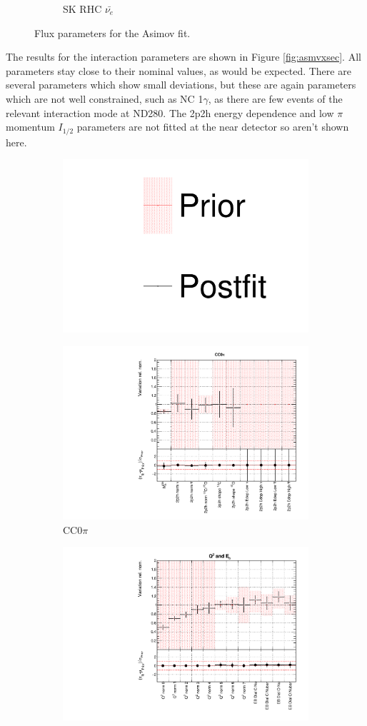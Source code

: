 \begin{figure}
\begin{subfigure}{0.24\textwidth}
  \caption{SK RHC $\bar{\nu_e}$}
\end{subfigure}
\caption{Flux parameters for the Asimov fit.}
\label{fig:asmvfluxSK}
\end{figure}

The results for the interaction parameters are shown in Figure \ref{fig:asmvxsec}. All parameters stay close to their nominal values, as would be expected. There are several parameters which show small deviations, but these are again parameters which are not well constrained, such as NC 1$\gamma$, as there are few events of the relevant interaction mode at ND280. The 2p2h energy dependence and low $\pi$ momentum $I_{1/2}$ parameters are not fitted at the near detector so aren't shown here.

\begin{figure}
\centering
\begin{subfigure}{0.95\textwidth}
  \centering
  \includegraphics[width=0.25\linewidth]{figs/asmv_leg}
\end{subfigure}
\begin{subfigure}{0.49\textwidth}
  \centering
  \includegraphics[width=0.9\linewidth]{figs/asmvxsec1}
  \caption{CC0$\pi$}
\end{subfigure}
\begin{subfigure}{0.49\textwidth}
  \centering
  \includegraphics[width=0.9\linewidth]{figs/asmvxsec2}

\end{subfigure}
\end{figure}
